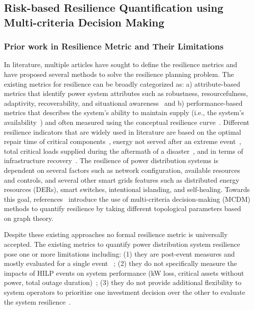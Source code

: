 
\subsection{Risk-based Resilience Quantification using Multi-criteria Decision Making}
\subsubsection{Prior work in Resilience Metric and Their Limitations}

In literature, multiple articles have sought to define the resilience metrics and have proposed several methods to solve the resilience planning problem. The existing metrics for resilience can be broadly categorized as: a) attribute-based metrics that identify power system attributes such as robustness, resourcefulness, adaptivity, recoverability, and situational awareness~\cite{kandaperumal2020resilience} and b) performance-based metrics that describes the system's ability to maintain supply (i.e., the system's availability~\cite{cai2018availability}) and often measured using the conceptual resilience curve~\cite{panteli2017power}. 
Different resilience indicators that are widely used in literature are based on the optimal repair time of critical components~\cite{wen2020resilience}, energy not served after an extreme event~\cite{espinoza2017seismic}, total critical loads supplied during the aftermath of a disaster~\cite{poudel2018critical}, and  in terms of infrastructure recovery~\cite{umunnakwe2021quantitative}. 
The resilience of power distribution systems is dependent on several factors such as network configuration, available resources and controls, and several other smart grids features such as distributed energy resources (DERs), smart switches, intentional islanding, and self-healing. Towards this goal, references~\cite{7728107, chanda2016defining} introduce the use of multi-criteria decision-making (MCDM) methods to quantify resilience by taking different topological parameters based on graph theory.

Despite these existing approaches no formal resilience metric is universally accepted. The existing metrics to quantify power distribution system resilience pose one or more limitations including: (1) they are post-event measures and mostly evaluated for a single event~\cite{gao2016resilience, poudel2018critical, wen2020resilience} ; (2) they do not specifically measure the impacts of HILP events on system performance (kW loss, critical assets without power, total outage duration)~\cite{7728107, chanda2016defining}; (3) they do not provide additional flexibility to system operators to prioritize one investment decision over the other to evaluate the system resilience~\cite{8767980}. 

